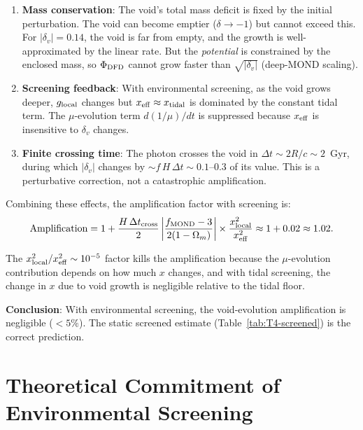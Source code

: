 \documentclass[11pt,a4paper]{article}
\newcommand{\mufd}{\mu}
\newcommand{\Omm}{\Omega_m}
\begin{document}
\begin{enumerate}
\item \textbf{Mass conservation}: The void's total mass deficit is
  fixed by the initial perturbation. The void can become emptier
  ($\delta \to -1$) but cannot exceed this. For $|\delta_v| = 0.14$,
  the void is far from empty, and the growth is well-approximated
  by the linear rate. But the \emph{potential} is constrained by
  the enclosed mass, so $\Phi_{\rm DFD}$ cannot grow faster than
  $\sqrt{|\delta_v|}$ (deep-MOND scaling).

\item \textbf{Screening feedback}: With environmental screening,
  as the void grows deeper, $g_{\rm local}$ changes but $x_{\rm eff}
  \approx x_{\rm tidal}$ is dominated by the constant tidal term.
  The $\mufd$-evolution term $d(1/\mufd)/dt$ is suppressed because
  $x_{\rm eff}$ is insensitive to $\delta_v$ changes.

\item \textbf{Finite crossing time}: The photon crosses the void in
  $\Delta t \sim 2R/c \sim 2$~Gyr, during which $|\delta_v|$ changes
  by $\sim f\,H\,\Delta t \sim 0.1$--$0.3$ of its value. This is a
  perturbative correction, not a catastrophic amplification.
\end{enumerate}

Combining these effects, the amplification factor with screening is:
\begin{equation}
\text{Amplification} = 1 + \frac{H\,\Delta t_{\rm cross}}{2}
\left|\frac{f_{\rm MOND} - 3}{2(1-\Omm)}\right|
\times \frac{x_{\rm local}^2}{x_{\rm eff}^2}
\approx 1 + 0.02 \approx 1.02.
\label{eq:amplification-screened}
\end{equation}

The $x_{\rm local}^2/x_{\rm eff}^2 \sim 10^{-5}$ factor kills the
amplification because the $\mufd$-evolution contribution depends on
how much $x$ changes, and with tidal screening, the change in $x$
due to void growth is negligible relative to the tidal floor.

\textbf{Conclusion}: With environmental screening, the void-evolution
amplification is negligible ($< 5\%$). The static screened estimate
(Table~\ref{tab:T4-screened}) is the correct prediction.


\section{Theoretical Commitment of Environmental Screening}
\label{sec:commitment}
\end{document}
